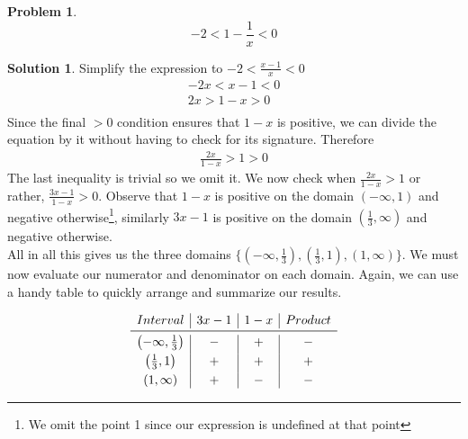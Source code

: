 \documentclass[a4paper]{article}
\theoremstyle{definition}
\newtheorem{problem}{Problem}[section]
\newtheorem*{solution}{Solution}
\begin{document}

\begin{problem}
\[
-2 < 1 - \frac{1}{x} < 0
\]
\end{problem}
\begin{solution}
Simplify the expression to \(-2 < \frac{x-1}{x} < 0\)
\begin{align*}
-2x < x -1 < 0 \\
2x > 1-x > 0 \\
\end{align*}
Since the final \(> 0\) condition ensures that \(1-x\) is positive, we can divide the equation by it without having to check for its signature. Therefore
\begin{align*}
\frac{2x}{1-x} > 1 > 0
\end{align*}
The last inequality is trivial so we omit it. We now check when \(\frac{2x}{1-x} > 1\) or rather, \(\frac{3x-1}{1-x} > 0\). Observe that \(1-x\) is positive on the domain \((-\infty, 1)\) and negative otherwise\footnote{We omit the point 1 since our expression is undefined at that point}, similarly \(3x-1\) is positive on the domain \((\frac{1}{3}, \infty)\) and negative otherwise. \\ 

All in all this gives us the three domains \(\{(-\infty, \frac{1}{3}), (\frac{1}{3}, 1), (1, \infty)\}\). We must now evaluate our numerator and denominator on each domain. Again, we can use a handy table to quickly arrange and summarize our results.

\[
\begin{array}{c|c|c|c}
Interval & 3x-1 & 1 - x & Product \\
\midrule
\left(-\infty, \frac{1}{3}\right) & - & + & - \\[3pt]
\left(\frac{1}{3}, 1\right) & + & + & + \\[3pt]
(1, \infty) & + & - & -
\end{array}
\]


\end{solution}
\end{document}
